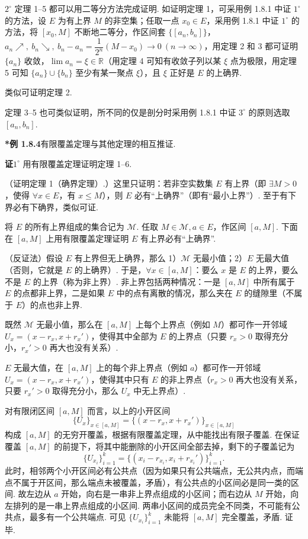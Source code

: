 \documentclass[UTF8,12pt,a4paper,fontset=fandol]{ctexart}
\begin{document}
$2^\circ$ 定理 1--5 都可以用二等分方法完成证明. 如证明定理 1，可采用例 1.8.1 中证 $1^\circ$ 的方法，设 $E$ 为有上界 $M$ 的非空集；任取一点 $x_0\in E$，采用例 1.8.1 中证 $1^\circ$ 的方法，将 $[x_0,M]$ 不断地二等分，作区间套 $\{[a_n,b_n]\}$，$a_n\nearrow,\ b_n\searrow,\ b_n-a_n=\dfrac1{2^n}(M-x_0)\to0\ (n\to\infty)$，用定理 2 和 3 都可证明 $\{a_n\}$ 收敛，$\lim a_n=\xi\in\mathbb{R}$（用定理 4 可知有收敛子列以某 $\xi$ 点为极限，用定理 5 可知 $\{a_n\}\cup\{b_n\}$ 至少有某一聚点 $\xi$），且 $\xi$ 正好是 $E$ 的上确界.

类似可证明定理 2.

定理 3--5 也可类似证明，所不同的仅是剖分时采用例 1.8.1 中证 $3^\circ$ 的原则选取 $[a_n,b_n]$.

\noindent\textbf{*例 1.8.4}\quad 有限覆盖定理与其他定理的相互推证.

\noindent\textbf{证}\quad $1^\circ$ 用有限覆盖定理证明定理 1--6.

（证明定理 1（确界定理）.）这里只证明：若非空实数集 $E$ 有上界（即 $\exists M>0$，使得 $\forall x\in E$，有 $x\le M$），则 $E$ 必有“上确界”（即有“最小上界”）. 至于有下界必有下确界，类似可证.

将 $E$ 的所有上界组成的集合记为 $\mathcal{M}$. 任取 $M\in\mathcal{M},a\in E$，作区间 $[a,M]$. 下面在 $[a,M]$ 上用有限覆盖定理证明 $E$ 有上界必有“上确界”.

（反证法）假设 $E$ 有上界但无上确界，那么 1）$\mathcal{M}$ 无最小值；2）$E$ 无最大值（否则，它就是 $E$ 的上确界）. 于是，$\forall x\in[a,M]$：要么 $x$ 是 $E$ 的上界，要么不是 $E$ 的上界（称为非上界）. 非上界包括两种情况：一是 $[a,M]$ 中所有属于 $E$ 的点都非上界，二是如果 $E$ 中的点有离散的情况，那么夹在 $E$ 的缝隙里（不属于 $E$）的点也非上界.

既然 $\mathcal{M}$ 无最小值，那么在 $[a,M]$ 上每个上界点（例如 $M$）都可作一开邻域 $U_x=(x-r_x,x+r_x')$，使得其中全部为 $E$ 的上界点（只要 $r_x>0$ 取得充分小，$r_x'>0$ 再大也没有关系）.

$E$ 无最大值，在 $[a,M]$ 上的每个非上界点（例如 $a$）都可作一开邻域 $U_x=(x-r_x,x+r_x')$，使得其中只有 $E$ 的非上界点（$r_x>0$ 再大也没有关系，只要 $r_x'>0$ 取得充分小，那么 $U_x$ 中无上界点）.

对有限闭区间 $[a,M]$ 而言，以上的小开区间
\[
  \{U_x\}_{x\in[a,M]}=\{(x-r_x,x+r_x')\}_{x\in[a,M]}
\]
构成 $[a,M]$ 的无穷开覆盖，根据有限覆盖定理，从中能找出有限子覆盖. 在保证覆盖 $[a,M]$ 的前提下，将其中能删除的小开区间全部去掉，剩下的子覆盖记为
\[
  \{U_{x_i}\}_{i=1}^k=\{(x_i-r_{x_i},x_i+r_{x_i}')\}_{i=1}^k.
\]
此时，相邻两个小开区间必有公共点（因为如果只有公共端点，无公共内点，而端点不属于开区间，那么端点未被覆盖，矛盾），有公共点的小区间必是同一类的区间. 故左边从 $a$ 开始，向右是一串非上界点组成的小区间；而右边从 $M$ 开始，向左排列的是一串上界点组成的小区间. 两串小区间的成员完全不同类，不可能有公共点，最多有一个公共端点. 可见 $\{U_{x_i}\}_{i=1}^k$ 未能将 $[a,M]$ 完全覆盖，矛盾. 证毕.
\end{document}
